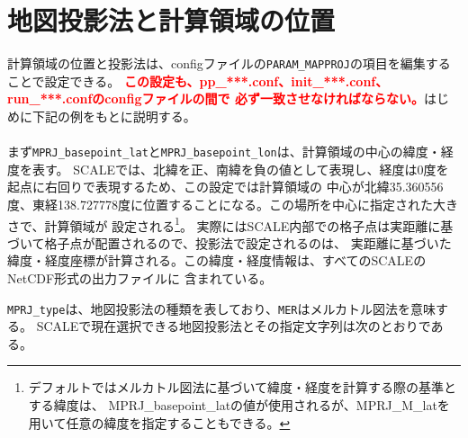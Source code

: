 







\section{地図投影法と計算領域の位置} \label{sec:adv_mapproj}
計算領域の位置と投影法は、configファイルの\verb|PARAM_MAPPROJ|の項目を編集することで設定できる。
\textcolor{red}{\bf この設定も、pp\_***.conf、init\_***.conf、run\_***.confのconfigファイルの間で
必ず一致させなければならない。}はじめに下記の例をもとに説明する。\\

\\

\noindent まず\verb|MPRJ_basepoint_lat|と\verb|MPRJ_basepoint_lon|は、計算領域の中心の緯度・経度を表す。
SCALEでは、北緯を正、南緯を負の値として表現し、経度は0度を起点に右回りで表現するため、この設定では計算領域の
中心が北緯35.360556度、東経138.727778度に位置することになる。この場所を中心に指定された大きさで、計算領域が
設定される\footnote{デフォルトではメルカトル図法に基づいて緯度・経度を計算する際の基準とする緯度は、
MPRJ\_basepoint\_latの値が使用されるが、MPRJ\_M\_latを用いて任意の緯度を指定することもできる。}。
実際にはSCALE内部での格子点は実距離に基づいて格子点が配置されるので、投影法で設定されるのは、
実距離に基づいた緯度・経度座標が計算される。この緯度・経度情報は、すべてのSCALEのNetCDF形式の出力ファイルに
含まれている。

\verb|MPRJ_type|は、地図投影法の種類を表しており、\verb|MER|はメルカトル図法を意味する。
SCALEで現在選択できる地図投影法とその指定文字列は次のとおりである。


